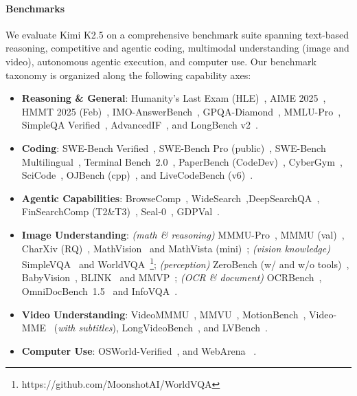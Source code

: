 \documentclass{article}
\newcommand{\citep}[1]{\parencite{#1}}
\begin{document}
\paragraph{Benchmarks}
We evaluate Kimi K2.5 on a comprehensive benchmark suite spanning text-based reasoning, competitive and agentic coding, multimodal understanding (image and video), autonomous agentic execution, and computer use. Our benchmark taxonomy is organized along the following capability axes:
\begin{itemize}
\item \textbf{Reasoning \& General}: Humanity's Last Exam (HLE)~\citep{phan2025humanitysexam}, AIME 2025~\citep{aime2025}, HMMT 2025 (Feb)~\citep{hmmt2025feb}, IMO-AnswerBench~\citep{luong-etal-2025-towards}, GPQA-Diamond~\citep{rein2024gpqa}, MMLU-Pro~\citep{wang2024mmluprorobustchallengingmultitask}, SimpleQA Verified~\citep{haas2025simpleqaverifiedreliablefactuality}, AdvancedIF~\citep{he2025advancedifrubricbasedbenchmarkingreinforcement}, and LongBench v2~\citep{bai2025longbenchv2deeperunderstanding}.
\item \textbf{Coding}: 
SWE-Bench Verified~\citep{jimenez2023swe}, 
SWE-Bench Pro (public)~\citep{deng2025swe}, 
SWE-Bench Multilingual~\citep{jimenez2023swe}, 
Terminal Bench~2.0~\citep{merrill2026terminal}, 
PaperBench (CodeDev)~\citep{starace2025paperbench}, 
CyberGym~\citep{wang2025cybergym}, 
SciCode~\citep{tian2024scicode}, 
OJBench (cpp)~\citep{wang2025ojbench}, 
and LiveCodeBench (v6)~\citep{jain2024livecodebench}.
\item \textbf{Agentic Capabilities}: BrowseComp~\cite{wei2025browsecomp}, WideSearch~\cite{wong2025widesearch},DeepSearchQA~\cite{vedula2025deepsearchqa}, FinSearchComp (T2\&T3)~\cite{hu2025finsearchcomp}, Seal-0~\cite{pham2025sealqa}, GDPVal~\cite{patwardhan2025gdpval}.
\item \textbf{Image Understanding}: \textit{(math \& reasoning)} MMMU-Pro~\citep{yue2025mmmupro}, MMMU (val)~\citep{yue2023mmmu}, CharXiv (RQ)~\citep{wang2024charxiv}, MathVision~\citep{wang2024mathvision} and MathVista (mini)~\citep{lu2024mathvista}; \textit{(vision knowledge)} SimpleVQA~\citep{cheng2025simplevqa} and WorldVQA~\footnote{https://github.com/MoonshotAI/WorldVQA}; \textit{(perception)} ZeroBench (w/ and w/o tools)~\citep{roberts2025zerobench}, BabyVision~\citep{chen2026babyvision}, BLINK~\citep{fu2024blinkmultimodallargelanguage} and MMVP~\citep{tong2024eyeswideshutexploring}; \textit{(OCR \& document)} OCRBench~\citep{liu2024ocrbench}, OmniDocBench~1.5~\citep{ouyang2025omnidocbench} and InfoVQA~\citep{mathew2021infovqa}.
\item \textbf{Video Understanding}: VideoMMMU~\citep{hu2025videommmu}, MMVU~\citep{zhao2025mmvu}, MotionBench~\citep{hong2025motionbench}, Video-MME~\citep{fu2025videomme} (\textit{with subtitles}), LongVideoBench~\citep{wu2024longvideobench}, and LVBench~\citep{wang2025lvbench}.
\item \textbf{Computer Use}:  OSWorld-Verified~\cite{osworld_verified, OSWorld}, and WebArena ~\citep{zhou2023webarena}.
\end{itemize}
\end{document}
